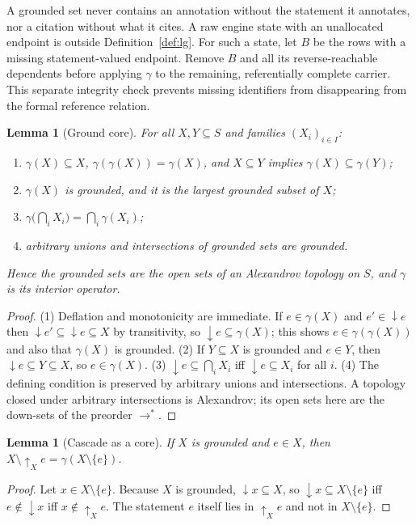 \documentclass[11pt]{article}
\theoremstyle{plain}
\newtheorem{lemma}[theorem]{Lemma}
\theoremstyle{definition}
\theoremstyle{remark}
\newcommand{\refs}{\rightarrow}          %
\newcommand{\supp}{{\downarrow}}          %
\newcommand{\dep}{{\uparrow}}            %
\newcommand{\core}{\gamma}               %
\begin{document}
A grounded set never contains an annotation without the statement it
annotates, nor a citation without what it cites. A raw engine state with an
unallocated endpoint is outside Definition~\ref{def:lg}. For such a state,
let $B$ be the rows with a missing statement-valued endpoint. Remove $B$ and
all its reverse-reachable dependents before applying $\core$ to the remaining,
referentially complete carrier. This separate integrity check prevents missing
identifiers from disappearing from the formal reference relation.

\begin{lemma}[Ground core]\label{lem:core}
For all $X,Y\subseteq S$ and families $(X_i)_{i\in I}$:
\begin{enumerate}
\item $\core(X)\subseteq X$, $\core(\core(X))=\core(X)$, and $X\subseteq Y$ implies $\core(X)\subseteq\core(Y)$;
\item $\core(X)$ is grounded, and it is the largest grounded subset of $X$;
\item $\core\bigl(\bigcap_i X_i\bigr)=\bigcap_i\core(X_i)$;
\item arbitrary unions and intersections of grounded sets are grounded.
\end{enumerate}
Hence the grounded sets are the open sets of an Alexandrov topology on $S$, and
$\core$ is its interior operator.
\end{lemma}

\begin{proof}
(1) Deflation and monotonicity are immediate. If $e\in\core(X)$ and
$e'\in\supp e$ then $\supp e'\subseteq\supp e\subseteq X$ by transitivity, so
$\supp e\subseteq\core(X)$; this shows $e\in\core(\core(X))$ and also that
$\core(X)$ is grounded. (2) If $Y\subseteq X$ is grounded and $e\in Y$, then
$\supp e\subseteq Y\subseteq X$, so $e\in\core(X)$. (3) $\supp e\subseteq\bigcap_i X_i$
iff $\supp e\subseteq X_i$ for all $i$. (4) The defining condition is preserved
by arbitrary unions and intersections. A topology closed under arbitrary
intersections is Alexandrov; its open sets here are the down-sets of the
preorder $\refs^{*}$.
\end{proof}

\begin{lemma}[Cascade as a core]\label{lem:cascade-core}
If $X$ is grounded and $e\in X$, then $X\setminus\dep_X e=\core(X\setminus\{e\})$.
\end{lemma}

\begin{proof}
Let $x\in X\setminus\{e\}$. Because $X$ is grounded, $\supp x\subseteq X$, so
$\supp x\subseteq X\setminus\{e\}$ iff $e\notin\supp x$ iff $x\notin\dep_X e$. The
statement $e$ itself lies in $\dep_X e$ and not in $X\setminus\{e\}$.
\end{proof}
\end{document}
